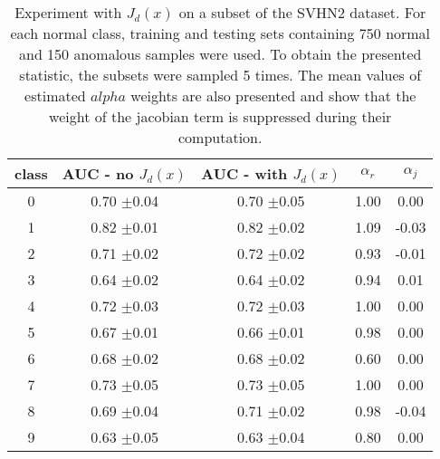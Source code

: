 \begin{table}[h] 
 \center 
 \begin{tabular}{c c c c c } 
 \toprule 
  class & AUC - no $J_d(x)$ & AUC - with $J_d(x)$ & $\alpha_r$ & $\alpha_j$  \\ 
  \midrule
  0 & 0.70 $\pm $0.04 & 0.70 $\pm $0.05 & 1.00 & 0.00  \\ 
  1 & 0.82 $\pm $0.01 & 0.82 $\pm $0.02 & 1.09 & -0.03  \\ 
  2 & 0.71 $\pm $0.02 & 0.72 $\pm $0.02 & 0.93 & -0.01  \\ 
  3 & 0.64 $\pm $0.02 & 0.64 $\pm $0.02 & 0.94 & 0.01  \\ 
  4 & 0.72 $\pm $0.03 & 0.72 $\pm $0.03 & 1.00 & 0.00  \\ 
  5 & 0.67 $\pm $0.01 & 0.66 $\pm $0.01 & 0.98 & 0.00  \\ 
  6 & 0.68 $\pm $0.02 & 0.68 $\pm $0.02 & 0.60 & 0.00  \\ 
  7 & 0.73 $\pm $0.05 & 0.73 $\pm $0.05 & 1.00 & 0.00  \\ 
  8 & 0.69 $\pm $0.04 & 0.71 $\pm $0.02 & 0.98 & -0.04  \\ 
  9 & 0.63 $\pm $0.05 & 0.63 $\pm $0.04 & 0.80 & 0.00  \\ 
  \bottomrule
 \end{tabular}
 \caption{Experiment with $J_d(x)$ on a subset of the SVHN2 dataset. For each normal class, training and testing sets containing 750 normal and 150 anomalous samples were used. To obtain the presented statistic, the subsets were sampled 5 times. The mean values of estimated $alpha$ weights are also presented and show that the weight of the jacobian term is suppressed during their computation.} 
 \label{tab:jacoceco_partial_experiment} 
\end{table}